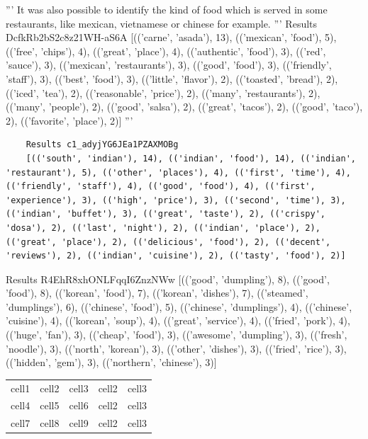 \documentclass[sigchi]{acmart}
\begin{document}
	'''
	It was also possible to identify the kind of food which is served in some restaurants, like mexican, vietnamese or chinese for example.
	'''
	Results DcfkRb2bS2c8z21WH-aS6A
	[(('carne', 'asada'), 13), (('mexican', 'food'), 5), (('free', 'chips'), 4), (('great', 'place'), 4), (('authentic', 'food'), 3), (('red', 'sauce'), 3), (('mexican', 'restaurants'), 3), (('good', 'food'), 3), (('friendly', 'staff'), 3), (('best', 'food'), 3), (('little', 'flavor'), 2), (('toasted', 'bread'), 2), (('iced', 'tea'), 2), (('reasonable', 'price'), 2), (('many', 'restaurants'), 2), (('many', 'people'), 2), (('good', 'salsa'), 2), (('great', 'tacos'), 2), (('good', 'taco'), 2), (('favorite', 'place'), 2)]
	'''
	\begin{verbatim}
	Results c1_adyjYG6JEa1PZAXMOBg
	[(('south', 'indian'), 14), (('indian', 'food'), 14), (('indian', 'restaurant'), 5), (('other', 'places'), 4), (('first', 'time'), 4), (('friendly', 'staff'), 4), (('good', 'food'), 4), (('first', 'experience'), 3), (('high', 'price'), 3), (('second', 'time'), 3), (('indian', 'buffet'), 3), (('great', 'taste'), 2), (('crispy', 'dosa'), 2), (('last', 'night'), 2), (('indian', 'place'), 2), (('great', 'place'), 2), (('delicious', 'food'), 2), (('decent', 'reviews'), 2), (('indian', 'cuisine'), 2), (('tasty', 'food'), 2)]
	\end{verbatim}
	
	\begin{spverbatim}
	Results R4EhR8xhONLFqqI6ZnzNWw
	[(('good', 'dumpling'), 8), (('good', 'food'), 8), (('korean', 'food'), 7), (('korean', 'dishes'), 7), (('steamed', 'dumplings'), 6), (('chinese', 'food'), 5), (('chinese', 'dumplings'), 4), (('chinese', 'cuisine'), 4), (('korean', 'soup'), 4), (('great', 'service'), 4), (('fried', 'pork'), 4), (('huge', 'fan'), 3), (('cheap', 'food'), 3), (('awesome', 'dumpling'), 3), (('fresh', 'noodle'), 3), (('north', 'korean'), 3), (('other', 'dishes'), 3), (('fried', 'rice'), 3), (('hidden', 'gem'), 3), (('northern', 'chinese'), 3)]
	\end{spverbatim}
	
	
	
	\begin{center}
		\begin{tabular}{ c c c c c}
			cell1 & cell2 & cell3  & cell2 & cell3\\ 
			cell4 & cell5 & cell6  & cell2 & cell3\\  
			cell7 & cell8 & cell9  & cell2 & cell3   
		\end{tabular}
	\end{center}
	
\end{document}
